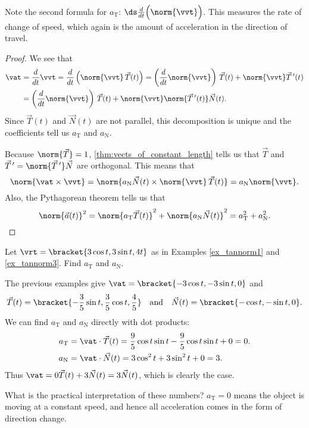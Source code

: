 Note the second formula for $a_{\mathrm{T}}$: $\ds \frac{d}{dt}\Big(\norm{\vvt}\Big)$. This measures the rate of change of speed, which again is the amount of acceleration in the direction of travel.

\begin{proof}
We see that
\begin{align*}
 \vat
 &=\frac d{dt}\vvt=\frac d{dt}\left(\norm{\vvt}\,\vec T(t)\right)
 =\left(\frac d{dt}\norm{\vvt}\right)\,\vec T(t)+\norm{\vvt}\vec T\,'(t) \\
 &=\left(\frac d{dt}\norm{\vvt}\right)\,\vec T(t)+\norm{\vvt}\norm{\vec T\,'(t)}\vec N(t).
\end{align*}
Since $\vec T(t)$ and $\vec N(t)$ are not parallel, this decomposition is unique and the coefficients tell us $a_\mathrm{T}$ and $a_\mathrm{N}$.

Because $\norm{\vec T}=1$, \autoref{thm:vects_of_constant_length} tells us that $\vec T$ and $\vec T\,'=\norm{\vec T\,'}\vec N$ are orthogonal.  This means that
\[
 \norm{\vat\times\vvt}
 =\norm{a_\mathrm{N}\vec N(t)\times\norm{\vvt}\,\vec T(t)}
 =a_\mathrm{N}\norm{\vvt}.
\]
Also, the Pythagorean theorem tells us that
\[
 \norm{\vec a(t)}^2=\norm{a_\mathrm{T}\vec T(t)}^2+\norm{a_\mathrm{N}\vec N(t)}^2
 =a_\mathrm{T}^2+a_\mathrm{N}^2.\qedhere
\]
\end{proof}

{Let $\vrt =\bracket{3\cos t, 3\sin t, 4t}$ as in Examples \ref{ex_tannorm1} and \ref{ex_tannorm3}. Find $a_\mathrm{T}$ and $a_\mathrm{N}$.}
{The previous examples give $\vat =\bracket{-3\cos t,-3\sin t,0}$ and 
\[\vec T(t) =\bracket{-\frac35\sin t,\frac35\cos t,\frac45}\quad \text{and}\quad \vec N(t) =\bracket{-\cos t,-\sin t,0}.\]
We can find $a_\mathrm{T}$ and $a_\mathrm{N}$ directly with dot products:
\begin{align*}
a_\mathrm{T} &= \vat\cdot \vec T(t) = \frac95\cos t\sin t-\frac95\cos t\sin t+0 = 0.\\
a_\mathrm{N} &= \vat\cdot \vec N(t) = 3\cos^2t+3\sin^2t + 0 = 3.
\end{align*}
Thus $\vat = 0\vec T(t) + 3\vec N(t) = 3\vec N(t)$, which is clearly the case.

What is the practical interpretation of these numbers? $a_\mathrm{T}=0$ means the object is moving at a constant speed, and hence all acceleration comes in the form of direction change.}

